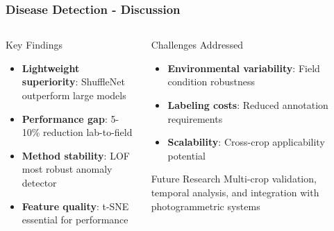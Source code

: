 \documentclass[aspectratio=43]{beamer}
\begin{document}
\begin{frame}
    \frametitle{\small Disease Detection - Discussion}
    
    \begin{columns}
        \begin{column}{0.5\textwidth}
            \begin{block}{Key Findings}
                \begin{itemize}
                    \item \textbf{Lightweight superiority}: ShuffleNet outperform large models
                    \item \textbf{Performance gap}: 5-10\% reduction lab-to-field
                    \item \textbf{Method stability}: LOF most robust anomaly detector
                    \item \textbf{Feature quality}: t-SNE essential for performance
                \end{itemize}
            \end{block}
        \end{column}
        
        \begin{column}{0.5\textwidth}
            \begin{alertblock}{Challenges Addressed}
                \begin{itemize}
                    \item \textbf{Environmental variability}: Field condition robustness
                    \item \textbf{Labeling costs}: Reduced annotation requirements
                    \item \textbf{Scalability}: Cross-crop applicability potential
                \end{itemize}
            \end{alertblock}
            
            \begin{exampleblock}{Future Research}
                Multi-crop validation, temporal analysis, and integration with photogrammetric systems
            \end{exampleblock}
        \end{column}
    \end{columns}
\end{frame}
\end{document}
